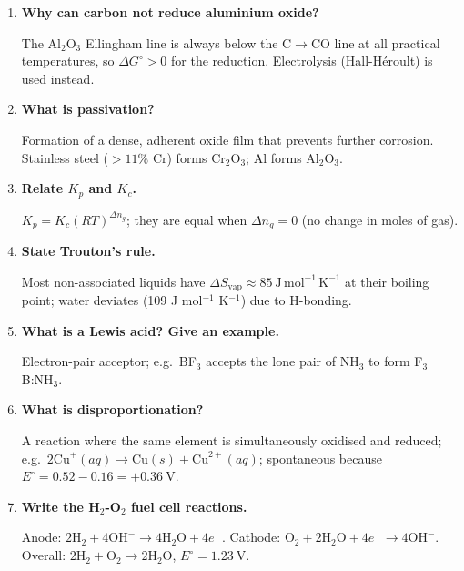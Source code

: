 \documentclass[12pt,a4paper]{article}
\newcommand{\Q}[1]{\textbf{#1}\par\noindent\ignorespaces}
\begin{document}
\begin{tcolorbox}[exambox, title={Frequently Asked / Viva Questions}]
\begin{enumerate}[topsep=0pt, label=\textbf{Q\arabic*.}, itemsep=5pt]
  \item \Q{Why can carbon not reduce aluminium oxide?}
    The Al$_2$O$_3$ Ellingham line is always below the C$\to$CO line at all practical temperatures, so $\Delta G^\circ > 0$ for the reduction. Electrolysis (Hall-H\'{e}roult) is used instead.
  \item \Q{What is passivation?}
    Formation of a dense, adherent oxide film that prevents further corrosion. Stainless steel ($>11\%$ Cr) forms Cr$_2$O$_3$; Al forms Al$_2$O$_3$.
  \item \Q{Relate $K_p$ and $K_c$.}
    $K_p = K_c(RT)^{\Delta n_g}$; they are equal when $\Delta n_g = 0$ (no change in moles of gas).
  \item \Q{State Trouton's rule.}
    Most non-associated liquids have $\Delta S_{\mathrm{vap}} \approx 85\ \mathrm{J\,mol^{-1}\,K^{-1}}$ at their boiling point; water deviates (109 J mol$^{-1}$ K$^{-1}$) due to H-bonding.
  \item \Q{What is a Lewis acid? Give an example.}
    Electron-pair acceptor; e.g.\ BF$_3$ accepts the lone pair of NH$_3$ to form F$_3$B:NH$_3$.
  \item \Q{What is disproportionation?}
    A reaction where the same element is simultaneously oxidised and reduced; e.g.\ $2\mathrm{Cu}^+(aq) \to \mathrm{Cu}(s) + \mathrm{Cu}^{2+}(aq)$; spontaneous because $E^\circ = 0.52 - 0.16 = +0.36\ \mathrm{V}$.
  \item \Q{Write the H$_2$-O$_2$ fuel cell reactions.}
    Anode: $2\mathrm{H_2} + 4\mathrm{OH}^- \to 4\mathrm{H_2O} + 4e^-$. Cathode: $\mathrm{O_2} + 2\mathrm{H_2O} + 4e^- \to 4\mathrm{OH}^-$. Overall: $2\mathrm{H_2} + \mathrm{O_2} \to 2\mathrm{H_2O}$, $E^\circ = 1.23\ \mathrm{V}$.
\end{enumerate}
\end{tcolorbox}
\end{document}
